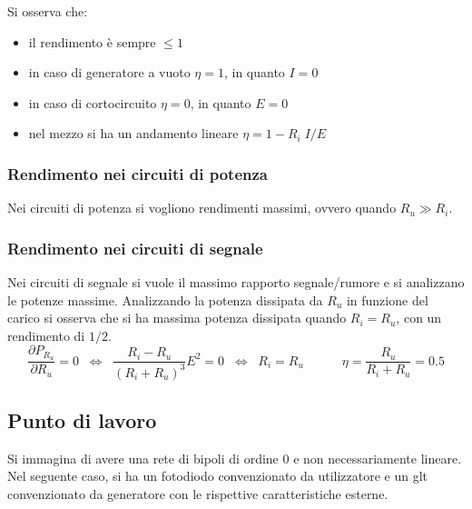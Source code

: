 \documentclass[a4paper]{article}
\begin{document}
Si osserva che:
\begin{itemize}
	\item il rendimento è sempre \(\leq 1\)
	\item in caso di generatore a vuoto \(\eta = 1\), in quanto \(I = 0\)
	\item in caso di cortocircuito \(\eta = 0\), in quanto \(E = 0\)
	\item nel mezzo si ha un andamento lineare \(\eta = 1 - R_i \; I / E\)
\end{itemize}

\subsubsection*{Rendimento nei circuiti di potenza}
Nei circuiti di potenza si vogliono rendimenti massimi, ovvero quando \(R_u \gg R_i\).

\subsubsection*{Rendimento nei circuiti di segnale}
Nei circuiti di segnale si vuole il massimo rapporto segnale/rumore e si analizzano le potenze massime. Analizzando la potenza dissipata
da \(R_u\) in funzione del carico si osserva che si ha massima potenza dissipata quando \(R_i = R_u\), con un rendimento di \(1/2\).
\[\frac{\partial P_{R_u}}{\partial R_u} = 0 \;\; \Leftrightarrow \;\; \frac{R_i - R_u}{(R_i + R_u)^3}E^2 = 0 \;\; \Leftrightarrow \;\; R_i = R_u \qquad\quad \eta = \frac{R_u}{R_i + R_u} = 0.5\]

\subsection{Punto di lavoro}
Si immagina di avere una rete di bipoli di ordine 0 e non necessariamente lineare. Nel seguente caso, si ha un fotodiodo
convenzionato da utilizzatore e un glt convenzionato da generatore con le rispettive caratteristiche esterne.
\end{document}
